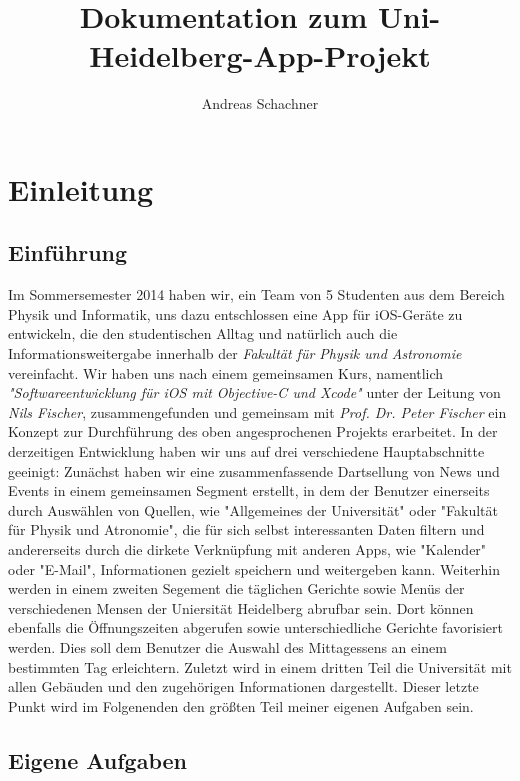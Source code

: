 \documentclass{scrreprt}
\author{Andreas Schachner}
\title{Dokumentation zum Uni-Heidelberg-App-Projekt}
\begin{document}
\maketitle
\newpage
\setcounter{page}{1}
\tableofcontents
\newpage
{}

\chapter{Einleitung}

\section{Einführung}

Im Sommersemester 2014 haben wir, ein Team von 5 Studenten aus dem Bereich Physik und Informatik, uns dazu entschlossen eine App für iOS-Geräte zu entwickeln, die den studentischen Alltag und natürlich auch die Informationsweitergabe innerhalb der \emph{Fakultät für Physik und Astronomie} vereinfacht. Wir haben uns nach einem gemeinsamen Kurs, namentlich \emph{"Softwareentwicklung für iOS mit Objective-C und Xcode"} unter der Leitung von \emph{Nils Fischer}, zusammengefunden und gemeinsam mit \emph{Prof. Dr. Peter Fischer} ein Konzept zur Durchführung des oben angesprochenen Projekts erarbeitet. In der derzeitigen Entwicklung haben wir uns auf drei verschiedene Hauptabschnitte geeinigt: Zunächst haben wir eine zusammenfassende Dartsellung von News und Events in einem gemeinsamen Segment erstellt, in dem der Benutzer einerseits durch Auswählen von Quellen, wie "Allgemeines der Universität" oder "Fakultät für Physik und Atronomie", die für sich selbst interessanten Daten filtern und andererseits durch die dirkete Verknüpfung mit anderen Apps, wie "Kalender" oder "E-Mail", Informationen gezielt speichern und weitergeben kann. Weiterhin werden in einem zweiten Segement die täglichen Gerichte sowie Menüs der verschiedenen Mensen der Uniersität Heidelberg abrufbar sein. Dort können ebenfalls die Öffnungszeiten abgerufen sowie unterschiedliche Gerichte favorisiert werden. Dies soll dem Benutzer die Auswahl des Mittagessens an einem bestimmten Tag erleichtern. Zuletzt wird in einem dritten Teil die Universität mit allen Gebäuden und den zugehörigen Informationen dargestellt. Dieser letzte Punkt wird im Folgenenden den größten Teil meiner eigenen Aufgaben sein.

\section{Eigene Aufgaben}
\end{document}
